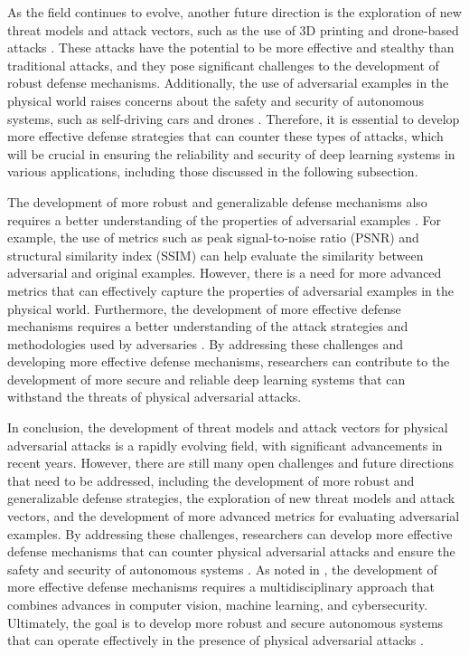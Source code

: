 \documentclass[11pt,a4paper]{article}
\begin{document}
As the field continues to evolve, another future direction is the exploration of new threat models and attack vectors, such as the use of 3D printing and drone-based attacks \cite{arxiv:1907.05418}. These attacks have the potential to be more effective and stealthy than traditional attacks, and they pose significant challenges to the development of robust defense mechanisms. Additionally, the use of adversarial examples in the physical world raises concerns about the safety and security of autonomous systems, such as self-driving cars and drones \cite{doi:10.1109/access.2023.3321118}. Therefore, it is essential to develop more effective defense strategies that can counter these types of attacks, which will be crucial in ensuring the reliability and security of deep learning systems in various applications, including those discussed in the following subsection.

The development of more robust and generalizable defense mechanisms also requires a better understanding of the properties of adversarial examples \cite{doi:10.1145/3274895.3274904}. For example, the use of metrics such as peak signal-to-noise ratio (PSNR) and structural similarity index (SSIM) can help evaluate the similarity between adversarial and original examples. However, there is a need for more advanced metrics that can effectively capture the properties of adversarial examples in the physical world. Furthermore, the development of more effective defense mechanisms requires a better understanding of the attack strategies and methodologies used by adversaries \cite{arxiv:1902.10899}. By addressing these challenges and developing more effective defense mechanisms, researchers can contribute to the development of more secure and reliable deep learning systems that can withstand the threats of physical adversarial attacks.

In conclusion, the development of threat models and attack vectors for physical adversarial attacks is a rapidly evolving field, with significant advancements in recent years. However, there are still many open challenges and future directions that need to be addressed, including the development of more robust and generalizable defense strategies, the exploration of new threat models and attack vectors, and the development of more advanced metrics for evaluating adversarial examples. By addressing these challenges, researchers can develop more effective defense mechanisms that can counter physical adversarial attacks and ensure the safety and security of autonomous systems \cite{doi:10.1109/tpami.2024.3430860}. As noted in \cite{doi:10.1016/j.eswa.2025.128967}, the development of more effective defense mechanisms requires a multidisciplinary approach that combines advances in computer vision, machine learning, and cybersecurity. Ultimately, the goal is to develop more robust and secure autonomous systems that can operate effectively in the presence of physical adversarial attacks \cite{arxiv:2409.20426}.
\end{document}
